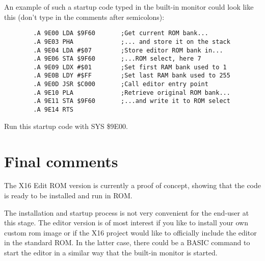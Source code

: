\documentclass{article}
\begin{document}
    \noindent An example of such a startup code typed in the built-in monitor could look like this (don't type in the comments after semicolons):

    \begin{verbatim}
        .A 9E00 LDA $9F60       ;Get current ROM bank...
        .A 9E03 PHA             ;... and store it on the stack
        .A 9E04 LDA #$07        ;Store editor ROM bank in...
        .A 9E06 STA $9F60       ;...ROM select, here 7
        .A 9E09 LDX #$01        ;Set first RAM bank used to 1
        .A 9E0B LDY #$FF        ;Set last RAM bank used to 255
        .A 9E0D JSR $C000       ;Call editor entry point
        .A 9E10 PLA             ;Retrieve original ROM bank...
        .A 9E11 STA $9F60       ;...and write it to ROM select
        .A 9E14 RTS
    \end{verbatim}

    \noindent Run this startup code with SYS \$9E00.

\section{Final comments}

    The X16 Edit ROM version is currently a proof of concept, showing that the code is ready to be installed and run in ROM.
    
    The installation and startup process is not very convenient for the end-user at this stage. The editor version is of most
    interest if you like to install your own custom rom image or if the X16 project would like to officially include the
    editor in the standard ROM. In the latter case, there could be a BASIC command to start the editor in a similar way
    that the built-in monitor is started.
\end{document}
